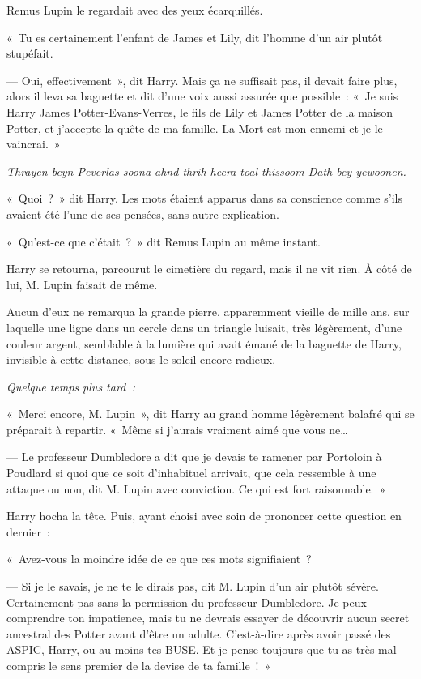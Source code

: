 Remus Lupin le regardait avec des yeux écarquillés.

«~Tu es certainement l'enfant de James et Lily, dit l'homme d'un air plutôt stupéfait.

--- Oui, effectivement~», dit Harry. Mais ça ne suffisait pas, il devait faire plus, alors il leva sa baguette et dit d'une voix aussi assurée que possible~: «~Je suis Harry James Potter-Evans-Verres, le fils de Lily et James Potter de la maison Potter, et j'accepte la quête de ma famille. La Mort est mon ennemi et je le vaincrai.~»

\emph{Thrayen beyn Peverlas soona ahnd thrih heera toal thissoom Dath bey yewoonen.}

«~Quoi~?~» dit Harry. Les mots étaient apparus dans sa conscience comme s'ils avaient été l'une de ses pensées, sans autre explication.

«~Qu'est-ce que c'était~?~» dit Remus Lupin au même instant.

Harry se retourna, parcourut le cimetière du regard, mais il ne vit rien. À côté de lui, M. Lupin faisait de même.

Aucun d'eux ne remarqua la grande pierre, apparemment vieille de mille ans, sur laquelle une ligne dans un cercle dans un triangle luisait, très légèrement, d'une couleur argent, semblable à la lumière qui avait émané de la baguette de Harry, invisible à cette distance, sous le soleil encore radieux.

\later

\emph{Quelque temps plus tard~:}

«~Merci encore, M. Lupin~», dit Harry au grand homme légèrement balafré qui se préparait à repartir. «~Même si j'aurais vraiment aimé que vous ne…

--- Le professeur Dumbledore a dit que je devais te ramener par Portoloin à Poudlard si quoi que ce soit d'inhabituel arrivait, que cela ressemble à une attaque ou non, dit M. Lupin avec conviction. Ce qui est fort raisonnable.~»

Harry hocha la tête. Puis, ayant choisi avec soin de prononcer cette question en dernier~:

«~Avez-vous la moindre idée de ce que ces mots signifiaient~?

--- Si je le savais, je ne te le dirais pas, dit M. Lupin d'un air plutôt sévère. Certainement pas sans la permission du professeur Dumbledore. Je peux comprendre ton impatience, mais tu ne devrais essayer de découvrir aucun secret ancestral des Potter avant d'être un adulte. C'est-à-dire après avoir passé des ASPIC, Harry, ou au moins tes BUSE. Et je pense toujours que tu as très mal compris le sens premier de la devise de ta famille~!~»

